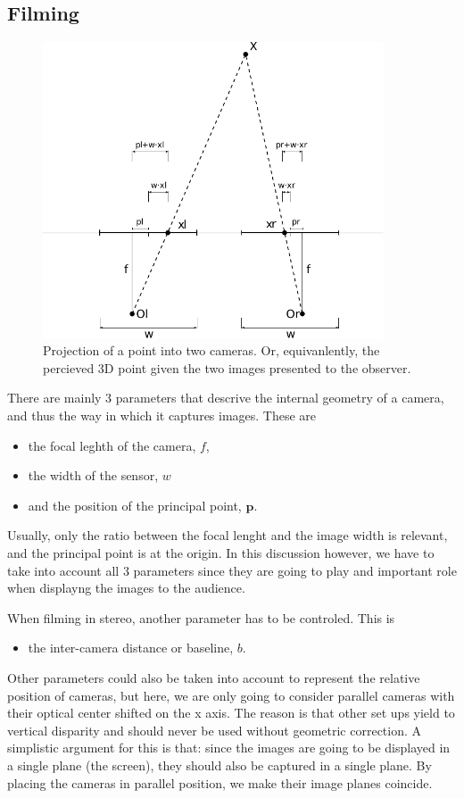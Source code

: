 \documentclass[12pt,a4paper]{article}
\def\p{\mathbf p}
\begin{document}
\subsection{Filming}
\begin{figure}
 \begin{center}
  \includegraphics[width=0.9\textwidth]{stereo_projection.pdf}
 \end{center}
 \caption{Projection of a point into two cameras.  Or, equivanlently, the percieved 3D point given the two images presented to the observer.}
\end{figure}


There are mainly 3 parameters that descrive the internal geometry of a camera, and thus the way in which it captures images.  These are
\begin{itemize}
 \item the focal leghth of the camera, $f$,
 \item the width of the sensor, $w$
 \item and the position of the principal point, $\p$.
\end{itemize}
Usually, only the ratio between the focal lenght and the image width is relevant, and the principal point is at the origin.  In this discussion however, we have to take into account all 3 parameters since they are going to play and important role when displayng the images to the audience.

When filming in stereo, another parameter has to be controled.  This is
\begin{itemize}
 \item the inter-camera distance or baseline, $b$.
\end{itemize}
Other parameters could also be taken into account to represent the relative position of cameras, but here, we are only going to consider parallel cameras with their optical center shifted on the x axis.  The reason is that other set ups yield to vertical disparity and should never be used without geometric correction.  A simplistic argument for this is that: since the images are going to be displayed in a single plane (the screen), they should also be captured in a single plane.  By placing the cameras in parallel position, we make their image planes coincide.
\end{document}
